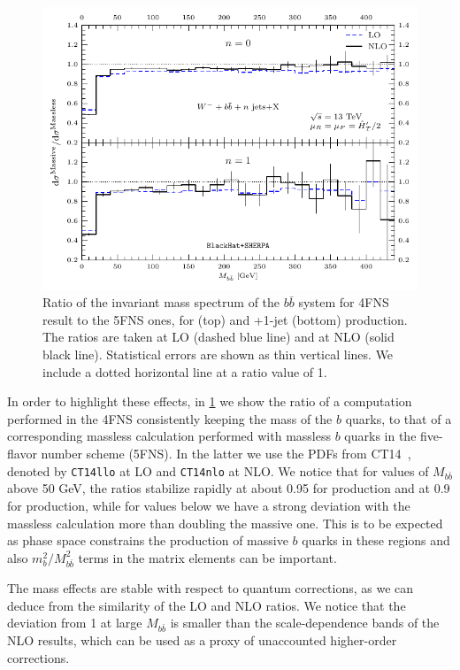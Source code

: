 \begin{figure}[ht]
  \centering
  \includegraphics[clip,scale=1.0]{plots/crmbb}
  \caption{Ratio of the invariant mass spectrum of the $b\bar b$ system for 4FNS
    result to the 5FNS ones, for \Wbbm{} (top) and \Wbbm+1-jet (bottom) production.
    The ratios are taken at LO (dashed blue line) and at NLO (solid black line).
    Statistical errors are shown as thin vertical lines. We include a dotted
  horizontal line at a ratio value of 1.}
  \label{fig:ratWmmbb}
\end{figure}

In order to highlight these effects, in \cref{fig:ratWmmbb} we show the ratio of
a computation performed in the 4FNS consistently keeping the mass of the $b$
quarks, to that of a corresponding massless calculation performed with massless
$b$ quarks in the five-flavor number scheme (5FNS). In the latter we use the
PDFs from CT14~\cite{CT14}, denoted by \texttt{CT14llo} at LO and
\texttt{CT14nlo} at NLO.  We notice that for values of $M_{b\bar b}$ above 50
GeV, the ratios stabilize rapidly at about 0.95 for \Wbb{} production and at
0.9 for \Wbbj{} production, while for values below we have a strong deviation
with the massless calculation more than doubling the massive one. This is to be
expected as phase space constrains the production of massive
$b$ quarks in these regions and also $m_b^2/M_{b\bar{b}}^2$ terms in
the matrix elements can be important.


The mass effects are stable with respect to quantum corrections, as we can
deduce from the similarity of the LO and NLO ratios. We notice that the deviation
from 1 at large $M_{b\bar b}$ is smaller than the scale-dependence bands of the
NLO results, which can be used as a proxy of unaccounted higher-order
corrections. 


